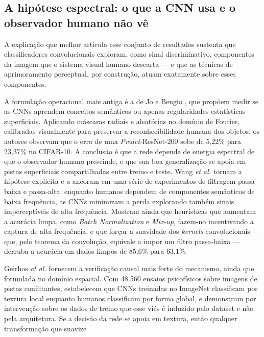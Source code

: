 \documentclass[conference]{IEEEtran}
\begin{document}
\subsection{A hipótese espectral: o que a CNN usa e o observador humano não vê}

A explicação que melhor articula esse conjunto de resultados sustenta que
classificadores convolucionais exploram, como sinal discriminativo, componentes
da imagem que o sistema visual humano descarta --- e que as técnicas de
aprimoramento perceptual, por construção, atuam exatamente sobre esses
componentes.

A formulação operacional mais antiga é a de Jo e Bengio \cite{b14}, que
propõem medir se as CNNs aprendem conceitos semânticos ou apenas regularidades
estatísticas superficiais. Aplicando máscaras radiais e aleatórias no domínio de
Fourier, calibradas visualmente para preservar a reconhecibilidade humana dos
objetos, os autores observam que o erro de uma \textit{Preact}-ResNet-200 sobe
de 5,22\% para 23,37\% no CIFAR-10. A conclusão é que a rede depende de energia
espectral de que o observador humano prescinde, e que sua boa generalização se
apoia em pistas superficiais compartilhadas entre treino e teste. Wang
\textit{et al.} \cite{b15} tornam a hipótese explícita e a ancoram em uma série
de experimentos de filtragem passa-baixa e passa-alta: enquanto humanos
dependem de componentes semânticos de baixa frequência, as CNNs minimizam a
perda explorando também sinais imperceptíveis de alta frequência. Mostram ainda
que heurísticas que aumentam a acurácia limpa, como \textit{Batch Normalization}
e \textit{Mix-up}, fazem-no incentivando a captura de alta frequência, e que
forçar a suavidade dos \textit{kernels} convolucionais --- que, pelo teorema da
convolução, equivale a impor um filtro passa-baixa --- derruba a acurácia em
dados limpos de 85,6\% para 63,1\%.

Geirhos \textit{et al.} \cite{b16} fornecem a verificação causal mais forte do
mecanismo, ainda que formulada no domínio espacial. Com 48.560 ensaios
psicofísicos sobre imagens de pistas conflitantes, estabelecem que CNNs
treinadas no ImageNet classificam por textura local enquanto humanos
classificam por forma global, e demonstram por intervenção sobre os dados de
treino que esse viés é induzido pelo dataset e não pela arquitetura. Se a
decisão da rede se apoia em textura, então qualquer transformação que suavize
\end{document}
